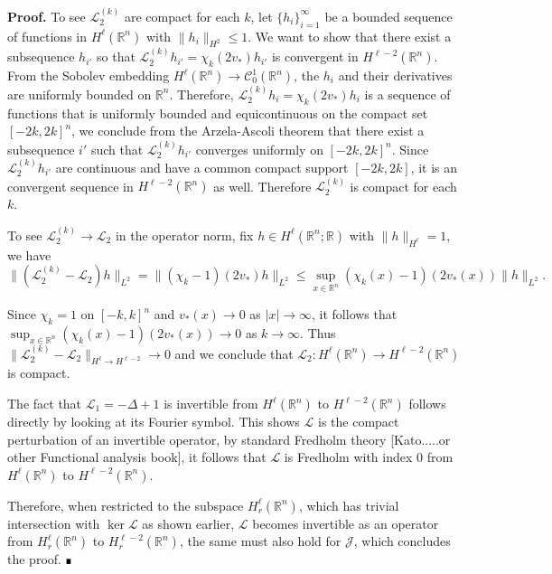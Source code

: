 \documentclass[letterpaper,11pt]{article}
\newcommand{\R}{\mathbb{R}}
\newcommand{\cL}{\mathcal{L}}
\numberwithin{equation}{section}
\theoremstyle{plain}
\theoremstyle{remark}
\newenvironment{Proof}[1][.]%
 {\begin{trivlist}\item[]\textbf{Proof#1 }}%
 {\hspace*{\fill}$\rule{0.3\baselineskip}{0.35\baselineskip}$\end{trivlist}}
\begin{document}
\begin{Proof}
To see $\cL_2^{(k)}$ are compact for each $k$, let $\{h_i\}_{i=1}^{\infty}$ be a bounded sequence of functions in $H^{\ell}(\R^n)$ with $\|h_i\|_{H^2} 
\le 1$. We want to show that there exist a subsequence $h_{i'}$ so that 
$\cL_2^{(k)} h_{i'} = \chi_k (2v_*)h_{i'}$ is convergent in $H^{\ell-2}(\R^n)$. From the Sobolev embedding $H^{\ell}(\R^n) \to 
\mathscr{C}^1_0(\R^n)$, the $h_i$ and their derivatives are uniformly 
bounded on $\R^n$. Therefore, $\cL_2^{(k)}h_i = \chi_k(2v_*)h_i$ is a 
sequence of functions that is uniformly bounded and equicontinuous on 
the compact set $[-2k,2k]^n$, we conclude from the Arzela-Ascoli 
theorem that there exist a subsequence $i'$ such that $\cL_2^{(k)}h_{i'}$ 
converges uniformly on $[-2k,2k]^n$. Since $\cL_2^{(k)}h_{i'}$ are 
continuous and have a common compact support $[-2k,2k]$, it is an 
convergent sequence in $H^{\ell-2}(\R^n)$ as well. Therefore $\cL_2^{(k)}$ is compact for each $k$.

To see $\cL_2^{(k)} \to \cL_2$ in the operator norm, fix $h \in H^\ell(\R^n;\R)$ with $\|h\|_{H^\ell} =1$, we have
\[
\|(\cL_2^{(k)}-\cL_2)h\|_{L^2} = \|(\chi_k-1)(2v_*)h\|_{L^2}\le  \sup_{x\in \R^n}(\chi_k(x)-1)(2v_*(x)) \|h\|_{L^2}.
\]

Since $\chi_k = 1$ on $[-k,k]^n$ and $v_*(x) \to 0$ as $|x|\to \infty$, it follows that $\displaystyle \sup_{x\in \R^n}(\chi_k(x)-1)(2v_*(x)) \to 0$ as $k \to \infty$. Thus $\|\cL_2^{(k)} - \cL_2\|_{H^\ell \to H^{\ell-2}} \to 0$ and we conclude that $\cL_2:H^\ell(\R^n) \to H^{\ell-2}(\R^n)$ is compact.

The fact that $\cL_1  = -\Delta  +1 $ is invertible from $H^\ell (\R^n)$ to $H^{\ell-2}(\R^n)$ follows directly by looking at its Fourier symbol. This shows $\cL$ is the compact perturbation of an invertible operator, by standard Fredholm theory [Kato.....or other Functional analysis book], it follows that $\cL$ is Fredholm with index $0$ from $H^\ell(\R^n)$ to $H^{\ell-2}(\R^n)$.

Therefore, when restricted to the subspace $H^\ell_r(\R^n)$, which has trivial intersection with $\ker \cL$ as shown earlier, $\cL$ becomes invertible as an operator from $H^\ell_r(\R^n)$ to $H^{\ell-2}_r(\R^n)$, the same must also hold for $\mathcal{J}$, which concludes the proof.
\end{Proof}


\end{document}
